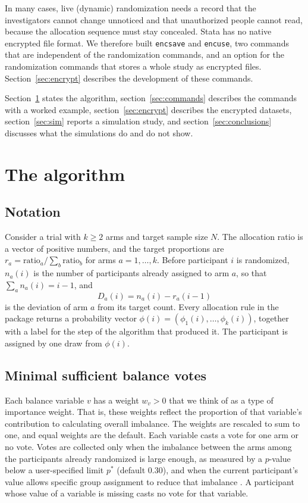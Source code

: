 \documentclass[bib]{statapress}
\begin{document}
In many cases, live (dynamic) randomization needs a record that the investigators cannot change
unnoticed and that unauthorized people cannot read, because the allocation
sequence must stay concealed. Stata has no native encrypted file format. We therefore
built \texttt{encsave} and \texttt{encuse}, two commands that are
independent of the randomization commands, and an option for the randomization
commands that stores a whole
study as encrypted files. Section~\ref{sec:encrypt} describes the
development of these commands.

Section~\ref{sec:algorithm} states the algorithm, section~\ref{sec:commands}
describes the commands with a worked example, section~\ref{sec:encrypt}
describes the encrypted datasets, section~\ref{sec:sim} reports a simulation
study, and section~\ref{sec:conclusions} discusses what the simulations do and
do not show.

\section{The algorithm}
\label{sec:algorithm}

\subsection{Notation}

Consider a trial with $k \ge 2$ arms and target sample size $N$. The allocation
ratio is a vector of positive numbers, and the target proportions are
$r_a = \text{ratio}_a / \sum_b \text{ratio}_b$ for arms $a = 1, \ldots, k$.
Before participant $i$ is randomized, $n_a(i)$ is the number of participants
already assigned to arm $a$, so that $\sum_a n_a(i) = i - 1$, and
\[
D_a(i) = n_a(i) - r_a (i - 1)
\]
is the deviation of arm $a$ from its target count. Every allocation rule in the
package returns a probability vector $\phi(i) = (\phi_1(i), \ldots,
\phi_k(i))$, together with a label for the step of the algorithm that produced
it. The participant is assigned by one draw from $\phi(i)$.

\subsection{Minimal sufficient balance votes}
\label{sec:votes}

Each balance variable $v$ has a weight $w_v > 0$ that we think of
as a type of importance weight. That is, these weights reflect the 
proportion of that variable's contribution to calculating overall
imbalance.  The weights are rescaled to
sum to one, and equal weights are the default. Each variable casts a vote for
one arm or no vote. Votes are collected only when the imbalance between the arms
among the participants already randomized is large enough, as measured by a
$p$-value below a user-specified limit $p^\ast$ (default 0.30), and when the current
participant's value allows specific group assignment to reduce that imbalance
\citep{zhao2015msb}. A participant whose value of a variable is missing casts
no vote for that variable.
\end{document}
